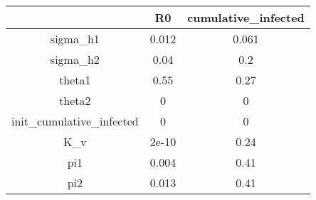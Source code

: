 \begin{tabular}{|c|c|c|}
\hline
& R0 & cumulative_infected \\
\hline
sigma_h1 & 0.012 & 0.061 \\
\hline
sigma_h2 & 0.04 & 0.2 \\
\hline
theta1 & 0.55 & 0.27 \\
\hline
theta2 & 0 & 0 \\
\hline
init_cumulative_infected & 0 & 0 \\
\hline
K_v & 2e-10 & 0.24 \\
\hline
pi1 & 0.004 & 0.41 \\
\hline
pi2 & 0.013 & 0.41 \\
\hline
\end{tabular}
